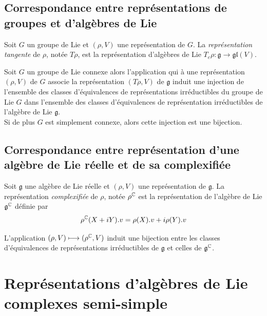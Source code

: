 \subsection{Correspondance entre représentations de groupes et d'algèbres de Lie}

\begin{definition}
    Soit $G$ un groupe de Lie et $(\rho, V)$ une représentation de $G$. La \emph{représentation tangente} de $\rho$, notée $T\rho$, est la représentation d'algèbres de Lie $T_e\rho: \mathfrak{g} \to \mathfrak{gl}(V)$.
\end{definition}

\begin{theorem}
    Soit $G$ un groupe de Lie connexe alors l'application qui à une représentation $(\rho, V)$ de $G$ associe la représentation $(T\rho, V)$ de $\mathfrak{g}$ induit une injection de l'ensemble des classes d'équivalences de représentations irréductibles du groupe de Lie $G$ dans l'ensemble des classes d'équivalences de représentation irréductibles de l'algèbre de Lie $\mathfrak{g}$. \\
    Si de plus $G$ est simplement connexe, alors cette injection est une bijection.
\end{theorem}

\omitted

\subsection{Correspondance entre représentation d'une algèbre de Lie réelle et de sa complexifiée}

\begin{definition}
    Soit $\mathfrak{g}$ une algèbre de Lie réelle et $(\rho, V)$ une représentation de $\mathfrak{g}$. La représentation \emph{complexifiée} de $\rho$, notée $\rho^{\mathbb{C}}$ est la représentation de l'algèbre de Lie $\mathfrak{g}^{\mathbb{C}}$ définie par 
    $$\rho^{\mathbb{C}}(X+iY).v = \rho(X).v + i \rho(Y).v$$
\end{definition}

\begin{theorem}
    L'application $(\rho, V) \longmapsto (\rho^{\mathbb{C}}, V)$ induit une bijection entre les classes d'équivalences de représentations irréductibles de $\mathfrak{g}$ et celles de $\mathfrak{g}^{\mathbb{C}}$.
\end{theorem}

\omitted

\section{Représentations d'algèbres de Lie complexes semi-simple}

\nocite{paulin2015liephysique}